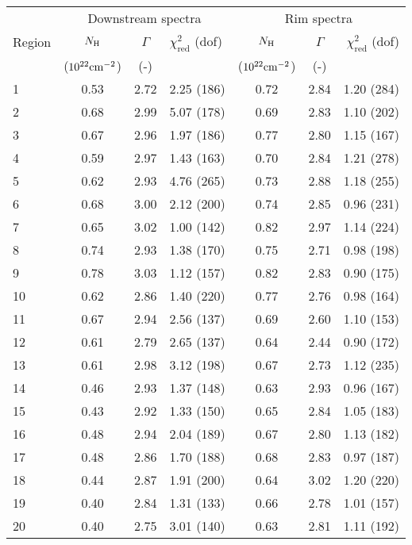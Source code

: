 \begin{tabular}{@{}lcclccr@{}}
\toprule
{} & \multicolumn{3}{c}{Downstream spectra}
   & \multicolumn{3}{c}{Rim spectra} \\
\cmidrule(lr){2-4} \cmidrule(l){5-7}
Region & $N_{\mathrm{H}}$ & $\Gamma$ & $\chi^2_{\mathrm{red}}$ (dof)
       & $N_{\mathrm{H}}$ & $\Gamma$ & $\chi^2_{\mathrm{red}}$ (dof) \\
{} & ($10^{22} \mathrm{cm}^{-2}$) & (-) & {}
   & ($10^{22} \mathrm{cm}^{-2}$) & (-) & {} \\
\midrule
 1 & 0.53 & 2.72 & 2.25 (186) & 0.72 & 2.84 & 1.20 (284) \\
 2 & 0.68 & 2.99 & 5.07 (178) & 0.69 & 2.83 & 1.10 (202) \\
 3 & 0.67 & 2.96 & 1.97 (186) & 0.77 & 2.80 & 1.15 (167) \\
\cmidrule{1-7}
 4 & 0.59 & 2.97 & 1.43 (163) & 0.70 & 2.84 & 1.21 (278) \\
 5 & 0.62 & 2.93 & 4.76 (265) & 0.73 & 2.88 & 1.18 (255) \\
 6 & 0.68 & 3.00 & 2.12 (200) & 0.74 & 2.85 & 0.96 (231) \\
 7 & 0.65 & 3.02 & 1.00 (142) & 0.82 & 2.97 & 1.14 (224) \\
 8 & 0.74 & 2.93 & 1.38 (170) & 0.75 & 2.71 & 0.98 (198) \\
 9 & 0.78 & 3.03 & 1.12 (157) & 0.82 & 2.83 & 0.90 (175) \\
10 & 0.62 & 2.86 & 1.40 (220) & 0.77 & 2.76 & 0.98 (164) \\
\cmidrule{1-7}
11 & 0.67 & 2.94 & 2.56 (137) & 0.69 & 2.60 & 1.10 (153) \\
12 & 0.61 & 2.79 & 2.65 (137) & 0.64 & 2.44 & 0.90 (172) \\
13 & 0.61 & 2.98 & 3.12 (198) & 0.67 & 2.73 & 1.12 (235) \\
\cmidrule{1-7}
14 & 0.46 & 2.93 & 1.37 (148) & 0.63 & 2.93 & 0.96 (167) \\
15 & 0.43 & 2.92 & 1.33 (150) & 0.65 & 2.84 & 1.05 (183) \\
16 & 0.48 & 2.94 & 2.04 (189) & 0.67 & 2.80 & 1.13 (182) \\
17 & 0.48 & 2.86 & 1.70 (188) & 0.68 & 2.83 & 0.97 (187) \\
\cmidrule{1-7}
18 & 0.44 & 2.87 & 1.91 (200) & 0.64 & 3.02 & 1.20 (220) \\
19 & 0.40 & 2.84 & 1.31 (133) & 0.66 & 2.78 & 1.01 (157) \\
20 & 0.40 & 2.75 & 3.01 (140) & 0.63 & 2.81 & 1.11 (192) \\
\bottomrule
\end{tabular}


